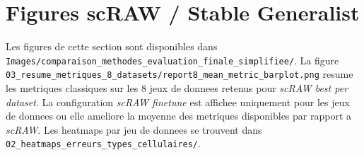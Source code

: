 \section*{Figures scRAW / Stable Generalist}

Les figures de cette section sont disponibles dans \texttt{Images/comparaison_methodes_evaluation_finale_simplifiee/}.
La figure \texttt{03_resume_metriques_8_datasets/report8_mean_metric_barplot.png} resume les metriques classiques sur les 8 jeux de donnees retenus pour \textit{scRAW best per dataset}.
La configuration \textit{scRAW finetune} est affichee uniquement pour les jeux de donnees ou elle ameliore la moyenne des metriques disponibles par rapport a \textit{scRAW}.
Les heatmaps par jeu de donnees se trouvent dans \texttt{02_heatmaps_erreurs_types_cellulaires/}.
